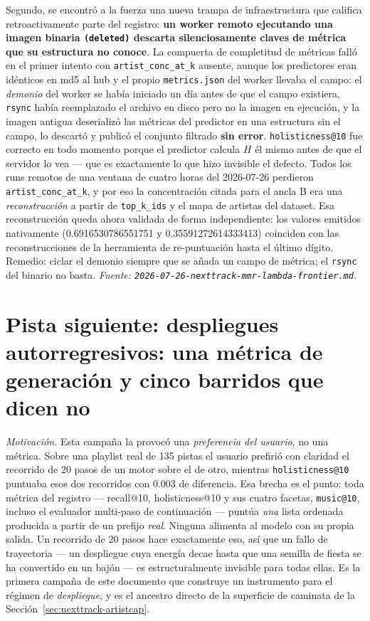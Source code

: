 \documentclass[11pt]{article}
\begin{document}
Segundo, se encontró a la fuerza una nueva trampa de infraestructura que califica
retroactivamente parte del registro: \textbf{un worker remoto ejecutando una
imagen binaria \texttt{(deleted)} descarta silenciosamente claves de métrica que
su estructura no conoce}. La compuerta de completitud de métricas falló en el
primer intento con \texttt{artist\_conc\_at\_k} ausente, aunque los predictores
eran idénticos en md5 al hub y el propio \texttt{metrics.json} del worker llevaba
el campo: el \emph{demonio} del worker se había iniciado un día antes de que el
campo existiera, \texttt{rsync} había reemplazado el archivo en disco pero no la
imagen en ejecución, y la imagen antigua deserializó las métricas del predictor en
una estructura sin el campo, lo descartó y publicó el conjunto filtrado
\textbf{sin error}. \texttt{holisticness@10} fue correcto en todo momento porque
el predictor calcula $H$ él mismo antes de que el servidor lo vea --- que es
exactamente lo que hizo invisible el defecto. Todos los runs remotos de una
ventana de cuatro horas del 2026-07-26 perdieron \texttt{artist\_conc\_at\_k}, y
por eso la concentración citada para el ancla B era una \emph{reconstrucción} a
partir de \texttt{top\_k\_ids} y el mapa de artistas del dataset. Esa
reconstrucción queda ahora validada de forma independiente: los valores emitidos
nativamente (\num{0.6916530786551751} y \num{0.35591272614333413}) coinciden con
las reconstrucciones de la herramienta de re-puntuación hasta el último dígito.
Remedio: ciclar el demonio siempre que se añada un campo de métrica; el
\texttt{rsync} del binario no basta.
\emph{Fuente: \texttt{2026-07-26-nexttrack-mmr-lambda-frontier.md}.}

\section{Pista siguiente: despliegues autorregresivos: una métrica de generación y cinco barridos que dicen no}
\label{sec:nexttrack-rollout}
\emph{Motivación.} Esta campaña la provocó una \emph{preferencia del usuario}, no
una métrica. Sobre una playlist real de 135 pistas el usuario prefirió con
claridad el recorrido de 20 pasos de un motor sobre el de otro, mientras
\texttt{holisticness@10} puntuaba esos dos recorridos con \num{0.003} de
diferencia. Esa brecha es el punto: toda métrica del registro --- recall@10,
holisticness@10 y sus cuatro facetas, \texttt{music@10}, incluso el evaluador
multi-paso de continuación --- puntúa \emph{una} lista ordenada producida a partir
de un prefijo \emph{real}. Ninguna alimenta al modelo con su propia salida. Un
recorrido de 20 pasos hace exactamente eso, así que un fallo de trayectoria --- un
despliegue cuya energía decae hasta que una semilla de fiesta se ha convertido en
un bajón --- es estructuralmente invisible para todas ellas. Es la primera campaña
de este documento que construye un instrumento para el régimen de
\emph{despliegue}, y es el ancestro directo de la superficie de caminata de la
Sección~\ref{sec:nexttrack-artistcap}.
\end{document}
